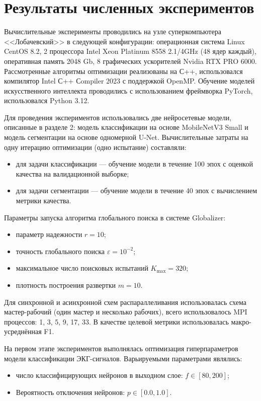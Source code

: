 \documentclass[11pt, oneside, a4paper]{article}
\begin{document}
\section{Результаты численных экспериментов}
\label{sec-result}

Вычислительные эксперименты проводились на узле суперкомпьютера <<Лобачевский>> в следующей конфигурации: операционная система Linux CentOS 8.2, 2 процессора Intel Xeon Platinum 8558 2.1/4GHz (48 ядер каждый), оперативная память 2048 Gb, 8 графических ускорителей Nvidia RTX PRO 6000. 
Рассмотренные алгоритмы оптимизации реализованы на С++, использовался компилятор Intel С++ Сompiler 2023 с поддержкой OpenMP. Обучение моделей искусственного интеллекта проводились с использованием фреймворка PyTorch, использовался Python 3.12.


Для проведения экспериментов использовались две нейросетевые модели, описанные в разделе 2: модель классификации на основе MobileNetV3 Small и модель сегментации на основе одномерной U-Net. Вычислительные затраты на одну итерацию оптимизации (одно испытание) составляли:
\begin{itemize}
    \item для задачи классификации --- обучение модели в течение 100 эпох с оценкой качества на валидационной выборке;
    \item для задачи сегментации --- обучение модели в течение 40 эпох с вычислением метрики качества.
\end{itemize}

Параметры запуска алгоритма глобального поиска в системе Globalizer:
\begin{itemize}
    \item параметр надежности $r = 10$;
    \item точность глобального поиска $\varepsilon = 10^{-2}$;
    \item максимальное число поисковых испытаний $K_{\max} = 320$;
    \item плотность построения развертки $m = 10$.
\end{itemize}

Для синхронной и асинхронной схем распараллеливания использовалась схема мастер-рабочий (один мастер и несколько рабочих), всего использовалось MPI процессов: 1, 3, 5, 9, 17, 33. В качестве целевой метрики использовалась макро-усреднённая F1.


На первом этапе экспериментов выполнялась оптимизация гиперпараметров модели классификации ЭКГ-сигналов. Варьируемыми параметрами являлись:
\begin{itemize}
    \item число классифицирующих нейронов в выходном слое: $f \in [80, 200]$;
    \item Вероятность отключения нейронов: $p \in [0.0, 1.0]$.
\end{itemize}
\end{document}
